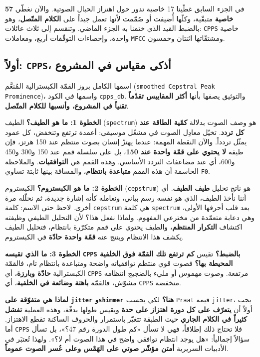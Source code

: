 \documentclass[12pt,a4paper]{report}
\newcommand{\E}[1]{\textenglish{\texttt{#1}}}
\newcommand{\N}[1]{\textenglish{#1}}
\newcommand{\qism}[1]{\subsection*{#1}}
\newcommand{\masdar}[1]{\par\vspace{2pt}{\small\textit{المصدر: #1}}\par}
\begin{document}
في الجزء السابق غطّينا \N{17} خاصية تدور حول اهتزاز الحبال الصوتية. والآن نغطّي
\textbf{\N{57} خاصية} متبقّية، وكلّها أُضيفت أو صُمّمت لأنها تعمل جيداً على
\textbf{الكلام المتّصل}، وهو بالضبط القيد الذي ختمنا به الجزء الماضي. وتنقسم إلى
ثلاث عائلات: \E{CPPS} خاصية واحدة، وإحصاءات التوقّفات أربع، ومعاملات \E{MFCC}
ومشتقّاتها اثنتان وخمسون.

\qism{أولاً: \E{CPPS}، أذكى مقياس في المشروع}

اسمها الكامل بروز القمّة الكبسترالية المُنعَّم
(\E{smoothed Cepstral Peak Prominence})، واسمها في الكود \E{cpps\_db}. والتوثيق
يصفها بأنها \textbf{أكثر المقاييس تقدّماً تقنياً في المشروع، وأنسبها للكلام
المتّصل}.

\textbf{الخطوة \N{1}: ما هو الطيف؟} الطيف (\E{spectrum}) هو وصف الصوت بدلالة
\textbf{كمّية الطاقة عند كل تردد}. تخيّل معادِل الصوت في مشغّل موسيقى: أعمدة
ترتفع وتنخفض، كل عمود يمثّل تردداً. والآن النقطة المهمة: عندما يهتزّ إنسان بصوت
منتظم عند \N{150} هرتز، فإن طيفه \textbf{لا يحتوي على قمّة واحدة عند \N{150}}، بل
على سلسلة قمم عند \N{150} و\N{300} و\N{450} و\N{600}، أي عند مضاعفات التردد
الأساسي. وهذه القمم هي \textbf{التوافقيات}. والملاحظة الحاسمة أن هذه القمم
\textbf{متباعدة بانتظام}، والمسافة بينها ثابتة تساوي \E{F0}.

\textbf{الخطوة \N{2}: ما هو الكبستروم؟} الكبستروم (\E{cepstrum}) هو ناتج تحليل
\textbf{طيف الطيف}. أي أننا نأخذ الطيف، الذي هو نفسه رسم بياني، ونعامله كأنه
إشارة جديدة، ثم نحلّله مرة أخرى. لاحظ حتى الاسم: كلمة \E{cepstrum} هي كلمة
\E{spectrum} بعد قلب أحرفها الأولى، وهي دعابة متعمّدة من مخترعي المفهوم. ولماذا
نفعل هذا؟ لأن التحليل الطيفي وظيفته اكتشاف \textbf{التكرار المنتظم}، والطيف يحتوي
على قمم متكرّرة بانتظام، فتحليل الطيف يكشف هذا الانتظام وينتج عنه \textbf{قمّة
واحدة حادّة} في الكبستروم.

\textbf{الخطوة \N{3}: ما الذي تقيسه \E{CPPS} بالضبط؟} تقيس \textbf{كم ترتفع تلك
القمّة فوق الخلفية المحيطة بها؟} فصوت قوي منتظم توافقياته واضحة ومتباعدة بانتظام
تام، فالقمّة الكبسترالية \textbf{حادّة وبارزة}، أي \E{CPPS} مرتفعة. وصوت مهموس أو
مليء بالضجيج انتظامه مشوّش، فالقمّة \textbf{باهتة وضائعة في الخلفية}، أي \E{CPPS}
منخفضة.
\masdar{\E{docs/02\_scientific\_background.md} القسم \N{2.3}}

\textbf{لماذا هي متفوّقة على \E{jitter} و\E{shimmer} هنا؟} لكي يحسب \E{Praat}
قيمة \E{jitter}، يجب أولاً أن \textbf{يتعرّف على كل دورة اهتزاز على حدة} ويقيس
طولها بدقّة، وهذه العملية \textbf{تفشل كثيراً في الكلام الجاري} حيث الطبقة تتغيّر
باستمرار والحروف الساكنة تقطع الاهتزاز. أما \E{CPPS} فلا تحتاج ذلك إطلاقاً، فهي
لا تسأل «كم طول الدورة رقم \N{47}؟»، بل تسأل سؤالاً إجمالياً: «هل يوجد انتظام
توافقي واضح في هذا الصوت أم لا؟». ولهذا تُعتبَر في الأدبيات السريرية \textbf{أمتن
مؤشّر صوتي على الهَمْس وعلى عُسر الصوت عموماً}.
\end{document}
